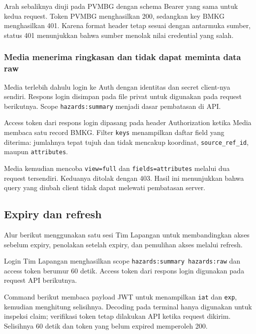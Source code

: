 Arah sebaliknya diuji pada PVMBG dengan schema Bearer yang sama untuk kedua request. Token PVMBG menghasilkan 200, sedangkan key BMKG menghasilkan 401. Karena format header tetap sesuai dengan antarmuka sumber, status 401 menunjukkan bahwa sumber menolak nilai credential yang salah.

\subsubsection{Media menerima ringkasan dan tidak dapat meminta data raw}
Media terlebih dahulu login ke Auth dengan identitas dan secret client-nya sendiri. Respons login disimpan pada file privat untuk digunakan pada request berikutnya. Scope \texttt{hazards:summary} menjadi dasar pembatasan di API.

Access token dari respons login dipasang pada header Authorization ketika Media membaca satu record BMKG. Filter \texttt{keys} menampilkan daftar field yang diterima: jumlahnya tepat tujuh dan tidak mencakup koordinat, \texttt{source\_ref\_id}, maupun \texttt{attributes}.

Media kemudian mencoba \texttt{view=full} dan \texttt{fields=attributes} melalui dua request tersendiri. Keduanya ditolak dengan 403. Hasil ini menunjukkan bahwa query yang diubah client tidak dapat melewati pembatasan server.

\subsection{Expiry dan refresh}
Alur berikut menggunakan satu sesi Tim Lapangan untuk membandingkan akses sebelum expiry, penolakan setelah expiry, dan pemulihan akses melalui refresh.

Login Tim Lapangan menghasilkan scope \texttt{hazards:summary hazards:raw} dan access token berumur 60 detik. Access token dari respons login digunakan pada request API berikutnya.

Command berikut membaca payload JWT untuk menampilkan \texttt{iat} dan \texttt{exp}, kemudian menghitung selisihnya. Decoding pada terminal hanya digunakan untuk inspeksi claim; verifikasi token tetap dilakukan API ketika request dikirim. Selisihnya 60 detik dan token yang belum expired memperoleh 200.

